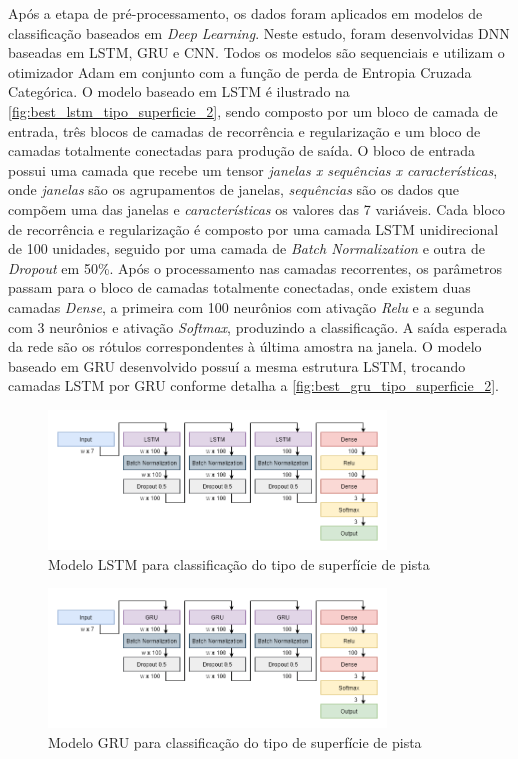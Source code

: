 Após a etapa de pré-processamento, os dados foram aplicados em modelos de classificação baseados em \textit{Deep Learning}. Neste estudo, foram desenvolvidas DNN baseadas em LSTM, GRU e CNN. Todos os modelos são sequenciais e utilizam o otimizador Adam em conjunto com a função de perda de Entropia Cruzada Categórica. O modelo baseado em LSTM é ilustrado na \autoref{fig:best_lstm_tipo_superficie_2}, sendo composto por um bloco de camada de entrada, três blocos de camadas de recorrência e regularização e um bloco de camadas totalmente conectadas para produção de saída. O bloco de entrada possui uma camada que recebe um tensor \emph{janelas x sequências x características}, onde \emph{janelas} são os agrupamentos de janelas, \emph{sequências} são os dados que compõem uma das janelas e \emph{características} os valores das 7 variáveis. Cada bloco de recorrência e regularização é composto por uma camada LSTM unidirecional de 100 unidades, seguido por uma camada de \textit{Batch Normalization} e outra de \textit{Dropout} em 50\%. Após o processamento nas camadas recorrentes, os parâmetros passam para o bloco de camadas totalmente conectadas, onde existem duas camadas \textit{Dense}, a primeira com 100 neurônios com ativação \textit{Relu} e a segunda com 3 neurônios e ativação \textit{Softmax}, produzindo a classificação. A saída esperada da rede são os rótulos correspondentes à última amostra na janela. O modelo baseado em GRU desenvolvido possuí a mesma estrutura LSTM, trocando camadas LSTM por GRU conforme detalha a \autoref{fig:best_gru_tipo_superficie_2}.

\begin{figure}[h!]
  \centering
  \caption{Modelo LSTM para classificação do tipo de superfície de pista}
  \label{fig:best_lstm_tipo_superficie_2}
  \includegraphics[width=0.8\textwidth]{figuras/fig_37.png}
\end{figure}

\begin{figure}[h!]
  \centering
  \caption{Modelo GRU para classificação do tipo de superfície de pista}
  \label{fig:best_gru_tipo_superficie_2}
  \includegraphics[width=0.8\textwidth]{figuras/fig_38.png}
\end{figure}


